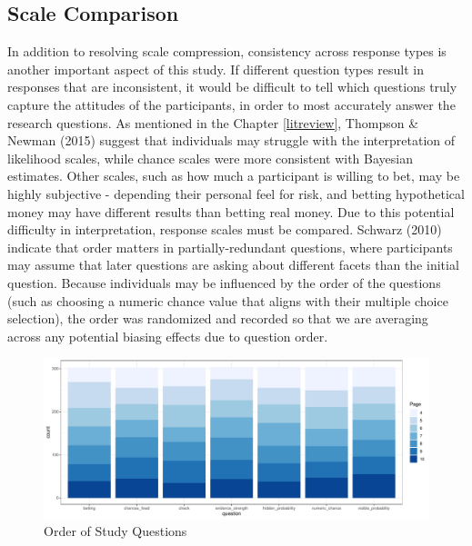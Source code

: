 \documentclass[print]{nuthesis}
\begin{document}
\hypertarget{scale-comparison}{%
\subsection{Scale Comparison}\label{scale-comparison}}

In addition to resolving scale compression, consistency across response types is another important aspect of this study.
If different question types result in responses that are inconsistent, it would be difficult to tell which questions truly capture the attitudes of the participants, in order to most accurately answer the research questions.
As mentioned in the Chapter \ref{litreview}, Thompson \& Newman (2015) suggest that individuals may struggle with the interpretation of likelihood scales, while chance scales were more consistent with Bayesian estimates.
Other scales, such as how much a participant is willing to bet, may be highly subjective - depending their personal feel for risk, and betting hypothetical money may have different results than betting real money.
Due to this potential difficulty in interpretation, response scales must be compared.
Schwarz (2010) indicate that order matters in partially-redundant questions, where participants may assume that later questions are asking about different facets than the initial question.
Because individuals may be influenced by the order of the questions (such as choosing a numeric chance value that aligns with their multiple choice selection), the order was randomized and recorded so that we are averaging across any potential biasing effects due to question order.

\begin{figure}

{\centering \includegraphics[width=\linewidth]{thesis_files/figure-latex/questorder-1} 

}

\caption{Order of Study Questions}\label{fig:questorder}
\end{figure}
\end{document}
